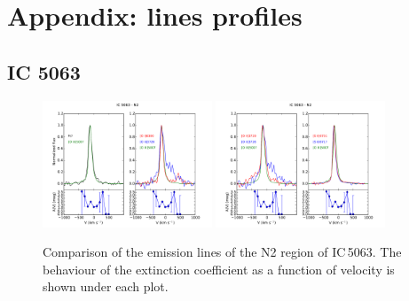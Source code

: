 \documentclass[../thesis.tex]{subfiles}
\begin{document}
\chapter{Appendix: lines profiles}
\label{cap:appendix1}

\section*{IC 5063}


\begin{figure}[h]
\centering
\includegraphics[width=0.45\textwidth]{images/paper1/IC5063_n2_l1.pdf} \quad
\includegraphics[width=0.45\textwidth]{images/paper1/IC5063_n2_l2.pdf}\\
\caption[]{Comparison of the emission lines of the N2 region of IC\,5063. The behaviour of the extinction coefficient as a function of velocity is shown under each plot.}
\label{fig:n2l1_I}
\end{figure}
\end{document}
